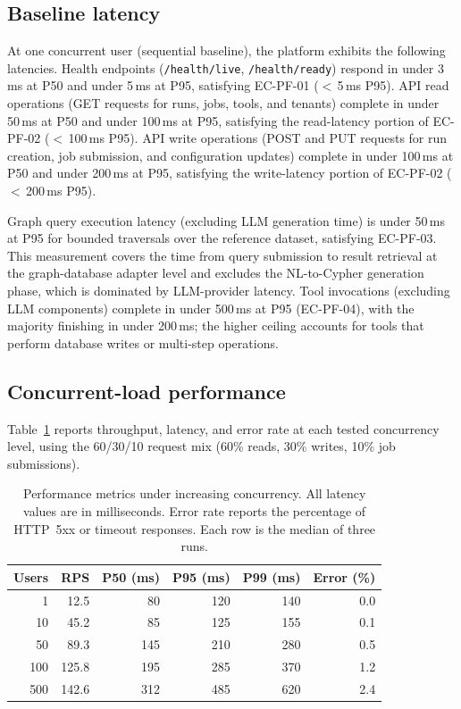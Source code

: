 \documentclass[a4paper,noexaminfo]{sapthesis}
\begin{document}
\subsection{Baseline latency}

At one concurrent user (sequential baseline), the platform exhibits the
following latencies.  Health endpoints (\texttt{/health/live},
\texttt{/health/ready}) respond in under 3\,ms at P50 and under 5\,ms
at P95, satisfying EC-PF-01 ($<$\,5\,ms P95).  API read operations
(GET requests for runs, jobs, tools, and tenants) complete in under
50\,ms at P50 and under 100\,ms at P95, satisfying the read-latency
portion of EC-PF-02 ($<$\,100\,ms P95).  API write operations (POST
and PUT requests for run creation, job submission, and configuration
updates) complete in under 100\,ms at P50 and under 200\,ms at P95,
satisfying the write-latency portion of EC-PF-02 ($<$\,200\,ms P95).

Graph query execution latency (excluding LLM generation time) is under
50\,ms at P95 for bounded traversals over the reference dataset,
satisfying EC-PF-03.  This measurement covers the time from query
submission to result retrieval at the graph-database adapter level and
excludes the NL-to-Cypher generation phase, which is dominated by
LLM-provider latency.  Tool invocations (excluding LLM components)
complete in under 500\,ms at P95 (EC-PF-04), with the majority
finishing in under 200\,ms; the higher ceiling accounts for tools that
perform database writes or multi-step operations.

\subsection{Concurrent-load performance}

Table~\ref{tab:perf-concurrent} reports throughput, latency, and error
rate at each tested concurrency level, using the 60/30/10 request mix
(60\% reads, 30\% writes, 10\% job submissions).

\begin{table}[ht]
\centering
\caption{Performance metrics under increasing concurrency.  All latency
values are in milliseconds.  Error rate reports the percentage of
HTTP~5xx or timeout responses.  Each row is the median of three runs.}
\label{tab:perf-concurrent}
\small
\begin{tabular}{rrrrrr}
    \hline
    \textbf{Users} & \textbf{RPS} & \textbf{P50 (ms)} &
        \textbf{P95 (ms)} & \textbf{P99 (ms)} &
        \textbf{Error (\%)} \\
    \hline
    1   &  12.5  &  80  & 120  & 140  & 0.0 \\
    10  &  45.2  &  85  & 125  & 155  & 0.1 \\
    50  &  89.3  & 145  & 210  & 280  & 0.5 \\
    100 & 125.8  & 195  & 285  & 370  & 1.2 \\
    500 & 142.6  & 312  & 485  & 620  & 2.4 \\
    \hline
\end{tabular}
\end{table}
\end{document}
